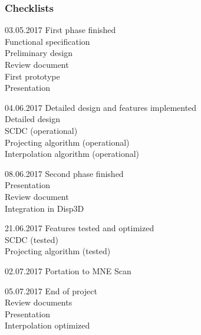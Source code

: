 \subsubsection{Checklists}
\begin{aims}
	\item[03.05.2017]First phase finished\\ Functional specification\\ Preliminary design\\Review document\\ First prototype\\Presentation
	\item[04.06.2017]Detailed design and features implemented\\ Detailed design\\SCDC (operational)\\Projecting algorithm (operational)\\Interpolation algorithm (operational)
	\item[08.06.2017]Second phase finished\\ Presentation\\Review document\\Integration in Disp3D
	\item[21.06.2017]Features tested and optimized\\ SCDC (tested)\\Projecting algorithm (tested)
	\item[02.07.2017] Portation to MNE Scan
	\item[05.07.2017]End of project\\ Review documents\\Presentation\\Interpolation optimized


\end{aims}

